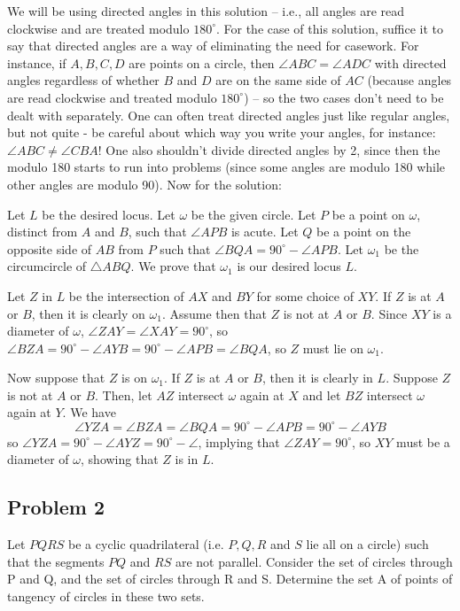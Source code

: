 \begin{mdsoln}
    We will be using directed angles in this solution – i.e., all angles are read clockwise and are treated modulo $180^\circ$. For the case of this solution, suffice it to say that directed angles are a way of eliminating the need for casework. For instance, if $A,B,C,D$ are points on a circle, then $\angle ABC=\angle ADC$ with directed angles regardless of whether $B$ and $D$ are on the same side of $AC$ (because angles are read clockwise and treated modulo $180^\circ$) – so the two cases don’t need to be dealt with separately. One can often treat directed angles just like regular angles, but not quite - be careful about which way you write your angles, for instance: $\angle ABC\ne \angle CBA$! One also shouldn’t divide directed angles by 2, since then the modulo 180 starts to run into problems (since some angles are modulo 180 while other angles are modulo 90). Now for the solution:

    Let $L$ be the desired locus. Let $\omega$ be the given circle. Let $P$ be a point on $\omega$, distinct from $A$ and $B$, such that $\angle APB$ is acute. Let $Q$ be a point on the opposite side of $AB$ from $P$ such that $\angle BQA=90^\circ-\angle APB$. Let $\omega_1$ be the circumcircle of $\triangle ABQ$. We prove that $\omega_1$ is our desired locus $L$.
    
    Let $Z$ in $L$ be the intersection of $AX$ and $BY$ for some choice of $XY$. If $Z$ is at $A$ or $B$, then it is clearly on $\omega_1$. Assume then that $Z$ is not at $A$ or $B$. Since $XY$ is a diameter of $\omega$, $\angle ZAY=\angle XAY=90^\circ$, so $\angle BZA=90^\circ-\angle AYB=90^\circ-\angle APB=\angle BQA$, so $Z$ must lie on $\omega_1$.
    
    Now suppose that $Z$ is on $\omega_1$. If $Z$ is at $A$ or $B$, then it is clearly in $L$. Suppose $Z$ is not at $A$ or $B$. Then, let $AZ$ intersect $\omega$ again at $X$ and let $BZ$ intersect $\omega$ again at $Y$. We have$$\angle YZA=\angle BZA=\angle BQA=90^\circ-\angle APB=90^\circ-\angle AYB$$so $\angle YZA=90^\circ-\angle AYZ=90^\circ-\angle $, implying that $\angle ZAY=90^\circ$, so $XY$ must be a diameter of $\omega$, showing that $Z$ is in $L$.
    
\end{mdsoln}
\subsection{Problem 2}

Let $PQRS$ be a cyclic quadrilateral (i.e. $P, Q, R$ and $S$ lie all on a circle) such that the segments $PQ$ and $RS$ are not parallel. Consider the set of circles through P and Q, and the set of circles through R and S. Determine the set A of points of tangency of circles in these two sets.


